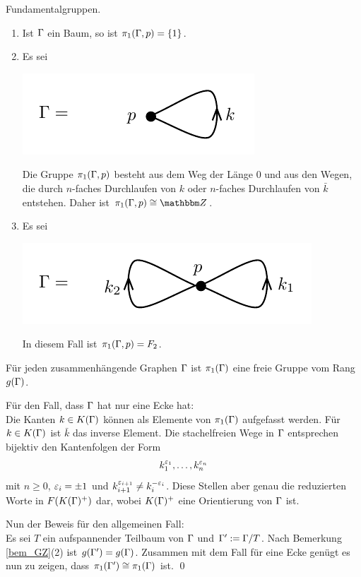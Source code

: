 \documentclass[a4paper, 12pt, twoside]{article}
\begin{document}
\BSP Fundamentalgruppen.
\begin{enumerate}
\item Ist $\Gamma$ ein Baum, so ist $\pi_1(\Gamma,p)=\{1\}$.
\item Es sei
\begin{center}
	\includegraphics{grugraImages/pi1Z}
\end{center}
Die Gruppe $\pi_1(\Gamma,p)$ besteht aus dem Weg der Länge $0$
und aus den Wegen, die durch
$n$-faches Durchlaufen von $k$ oder $n$-faches Durchlaufen von
$\bar{k}$ entstehen. Daher ist $\pi_1(\GR,p)\cong\ZZ$.
\item Es sei
\begin{center}
	\includegraphics{grugraImages/pi1F2}
\end{center}
In diesem Fall ist $\pi_1(\Gamma,p)=F_2$.
\end{enumerate}

\PROP\label{prop_zusfrei}
Für jeden zusammenhängende Graphen $\Gamma$ ist $\pi_1(\Gamma)$
eine freie Gruppe vom Rang $g(\Gamma)$.

\bew Für den Fall, dass $\Gamma$ hat nur eine Ecke hat:\\
Die Kanten $k\in K(\Gamma)$ können als Elemente von $\pi_1(\Gamma)$
aufgefasst werden. Für $k\in K(\Gamma)$ ist $\bar{k}$ das inverse
Element. Die stachelfreien Wege in $\Gamma$ entsprechen bijektiv
den Kantenfolgen der Form
\[
k_1^{\varepsilon_1},\ldots,k_n^{\varepsilon_n}
\]
mit $n\geq 0$, $\varepsilon_i=\pm 1$ und
$k_{i+1}^{\varepsilon_{i+1}}\neq k_i^{-\varepsilon_i}$.
Diese Stellen aber genau die reduzierten Worte in
$F(K(\Gamma)^+)$ dar, wobei $K(\Gamma)^+$ eine Orientierung von
$\Gamma$ ist.

Nun der Beweis für den allgemeinen Fall:\\
Es sei $T$ ein aufspannender Teilbaum
von $\Gamma$ und $\Gamma':=\Gamma/T$. Nach Bemerkung \ref{bem_GZ}(2) ist
$g(\Gamma')=g(\Gamma)$. Zusammen mit dem Fall für eine Ecke genügt es
nun zu zeigen, dass $\pi_1(\Gamma')\cong\pi_1(\Gamma)$ ist.
\qed
\end{document}
